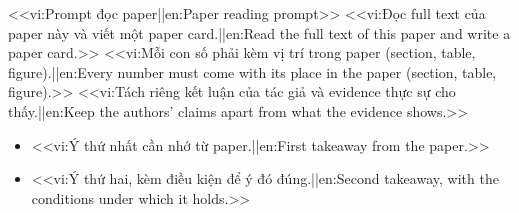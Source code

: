 \documentclass[12pt,a4paper]{article}
\begin{document}
\begin{lkprompt}{<<vi:Prompt đọc paper||en:Paper reading prompt>>}
<<vi:Đọc full text của paper này và viết một paper card.||en:Read the full text of this paper and write a paper card.>>
<<vi:Mỗi con số phải kèm vị trí trong paper (section, table, figure).||en:Every number must come with its place in the paper (section, table, figure).>>
<<vi:Tách riêng kết luận của tác giả và evidence thực sự cho thấy.||en:Keep the authors' claims apart from what the evidence shows.>>
\end{lkprompt}

\begin{summary}
\begin{itemize}
  \item <<vi:Ý thứ nhất cần nhớ từ paper.||en:First takeaway from the paper.>>
  \item <<vi:Ý thứ hai, kèm điều kiện để ý đó đúng.||en:Second takeaway, with the conditions under which it holds.>>
\end{itemize}
\end{summary}

\lkbibliography
\end{document}
